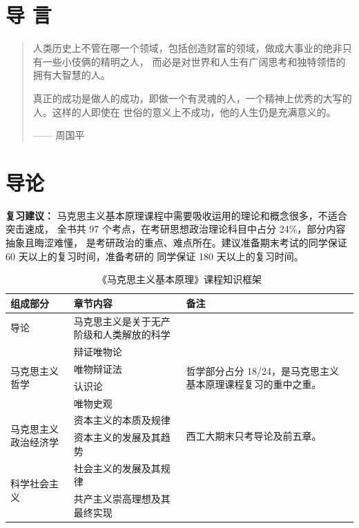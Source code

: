 \documentclass[11pt, UTF8]{book} %
\begin{document}
\makeatletter
\let\ps@plain\ps@empty
\makeatother


\newpage
\chapter*{导 \quad 言}

\begin{quote}
    人类历史上不管在哪一个领域，包括创造财富的领域，做成大事业的绝非只有一些小伎俩的精明之人，
    而必是对世界和人生有广阔思考和独特领悟的拥有大智慧的人。
    
    真正的成功是做人的成功，即做一个有灵魂的人，一个精神上优秀的大写的人。这样的人即使在
    世俗的意义上不成功，他的人生仍是充满意义的。
    
    \begin{flushright}
        \kaishu —— 周国平
    \end{flushright}
\end{quote}

\newpage
\thispagestyle{empty}

\chapter{导论}

{\heiti\bfseries 复习建议：}
马克思主义基本原理课程中需要吸收运用的理论和概念很多，不适合突击速成，
全书共 97 个考点，在考研思想政治理论科目中占分 24\%，部分内容抽象且晦涩难懂，
是考研政治的重点、难点所在。建议准备期末考试的同学保证 60 天以上的复习时间，准备考研的
同学保证 180 天以上的复习时间。

\begin{table}[H]
    \small
    \centering
    \caption{《马克思主义基本原理》课程知识框架}
    \begin{tabular}{p{}|p{}|p{}}
        \hline
        \textbf{组成部分} & \textbf{章节内容} & \textbf{备注} \\
        \hline 
        导论 & 马克思主义是关于无产阶级和人类解放的科学 \\ 
        \hline
        \multirow{4}{0.2\textwidth}{马克思主义哲学} 
        & 辩证唯物论 & \multirow{4}{0.3\textwidth}{哲学部分占分 18/24，是马克思主义基本原理课程复习的重中之重。} \\
        & 唯物辩证法 & \\
        & 认识论 & \\
        & 唯物史观 & \\
        \hline 
        \multirow{2}{0.2\textwidth}{马克思主义政治经济学}
        & 资本主义的本质及规律 
        & \multirow{2}{0.3\textwidth}{西工大期末只考导论及前五章。} \\ 
        & 资本主义的发展及其趋势 & \\ 
        \hline 
        \multirow{2}{0.2\textwidth}{科学社会主义}
        & 社会主义的发展及其规律 & \\ 
        & 共产主义崇高理想及其最终实现 & \\ 
        \hline
    \end{tabular}
\end{table}
\end{document}
